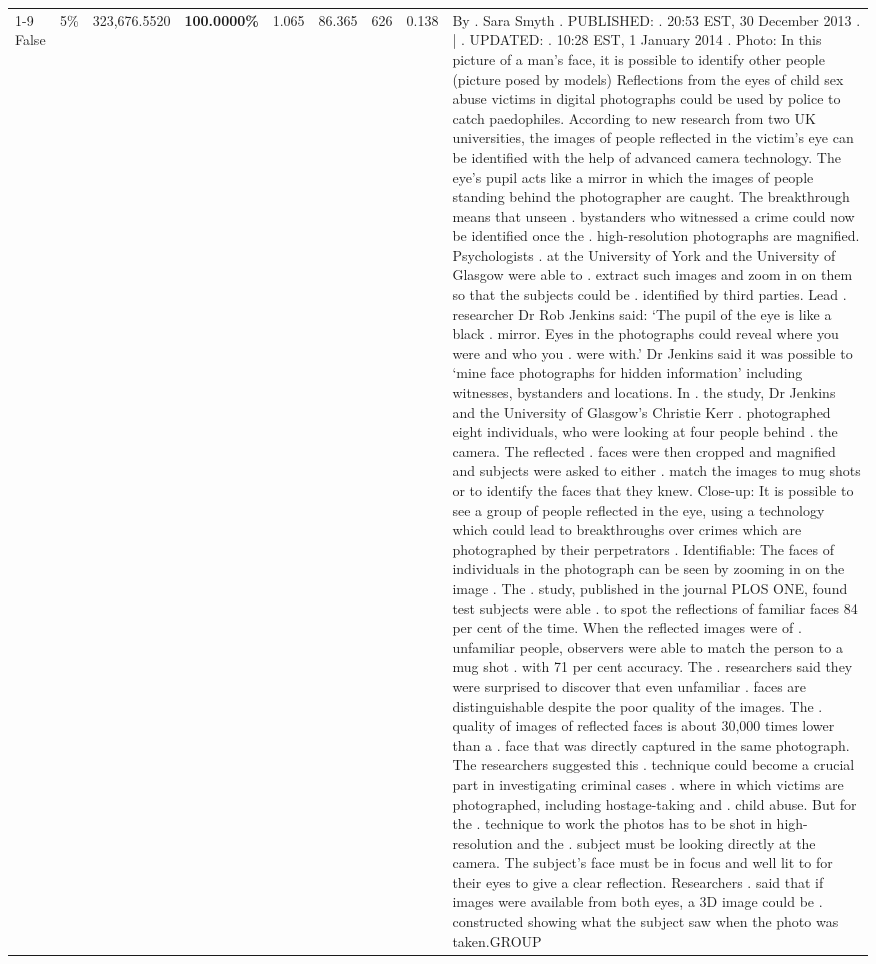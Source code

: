\begin{table}[H]
\begin{tabular}{lllrlllll}
\cline{1-9} \cline{2-9}
False & 5\% & 323,676.5520 & \bfseries \color{red} 100.0000\% & 1.065 & 86.365 & 626 & 0.138 & By . Sara Smyth . PUBLISHED: . 20:53 EST, 30 December 2013 . | . UPDATED: . 10:28 EST, 1 January 2014 . Photo: In this picture of a man's face, it is possible to identify other people (picture posed by models) Reflections from the eyes of child sex abuse victims in digital photographs could be used by police to catch paedophiles. According to new research from two UK universities, the images of people reflected in the victim's eye can be identified with the help of advanced camera technology. The eye's pupil acts like a mirror in which the images of people standing behind the photographer are caught. The breakthrough means that unseen . bystanders who witnessed a crime could now be identified once the . high-resolution photographs are magnified. Psychologists . at the University of York and the University of Glasgow were able to . extract such images and zoom in on them so that the subjects could be . identified by third parties. Lead . researcher Dr Rob Jenkins said: ‘The pupil of the eye is like a black . mirror. Eyes in the photographs could reveal where you were and who you . were with.' Dr Jenkins said it was possible to ‘mine face photographs for hidden information' including witnesses, bystanders and locations. In . the study, Dr Jenkins and the University of Glasgow's Christie Kerr . photographed eight individuals, who were looking at four people behind . the camera. The reflected . faces were then cropped and magnified and subjects were asked to either . match the images to mug shots or to identify the faces that they knew. Close-up: It is possible to see a group of people reflected in the eye, using a technology which could lead to breakthroughs over crimes which are photographed by their perpetrators . Identifiable: The faces of individuals in the photograph can be seen by zooming in on the image . The . study, published in the journal PLOS ONE, found test subjects were able . to spot the reflections of familiar faces 84 per cent of the time. When the reflected images were of . unfamiliar people, observers were able to match the person to a mug shot . with 71 per cent accuracy. The . researchers said they were surprised to discover that even unfamiliar . faces are distinguishable despite the poor quality of the images. The . quality of images of reflected faces is about 30,000 times lower than a . face that was directly captured in the same photograph. The researchers suggested this . technique could become a crucial part in investigating criminal cases . where in which victims are photographed, including hostage-taking and . child abuse. But for the . technique to work the photos has to be shot in high-resolution and the . subject must be looking directly at the camera. The subject's face must be in focus and well lit to for their eyes to give a clear reflection. Researchers . said that if images were available from both eyes, a 3D image could be . constructed showing what the subject saw when the photo was taken.GROUP \\

\end{tabular}
\end{table}
